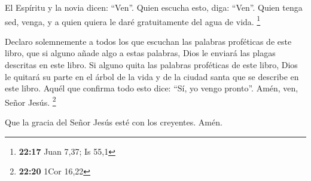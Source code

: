 El Espíritu y la novia dicen: ``Ven''. Quien escucha
esto, diga: ``Ven''. Quien tenga sed, venga, y a quien quiera le daré
gratuitamente del agua de vida. \footnote{\textbf{22:17} Juan 7,37; Is
  55,1}

 Declaro solemnemente a todos los que escuchan las
palabras proféticas de este libro, que si alguno añade algo a estas
palabras, Dios le enviará las plagas descritas en este libro.
 Si alguno quita las palabras proféticas de este libro,
Dios le quitará su parte en el árbol de la vida y de la ciudad santa que
se describe en este libro.  Aquél que confirma todo esto
dice: ``Sí, yo vengo pronto''. Amén, ven, Señor Jesús. \footnote{\textbf{22:20}
  1Cor 16,22}

 Que la gracia del Señor Jesús esté con los creyentes.
Amén.
